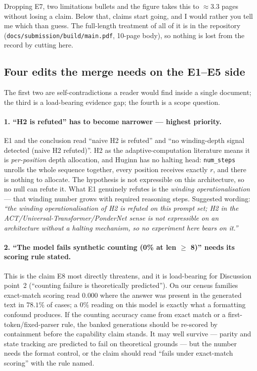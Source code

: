\documentclass[11pt,a4paper]{article}
\begin{document}
\noindent Dropping E7, two limitations bullets and the figure takes this to $\approx 3.3$ pages
without losing a claim. Below that, claims start going, and I would rather you tell me which than
guess. The full-length treatment of all of it is in the repository
(\texttt{docs/submission/build/main.pdf}, 10-page body), so nothing is lost from the record by
cutting here.

\subsection*{Four edits the merge needs on the E1--E5 side}

The first two are self-contradictions a reader would find inside a single document; the third is a
load-bearing evidence gap; the fourth is a scope question.

\paragraph{1. ``H2 is refuted'' has to become narrower --- highest priority.}
E1 and the conclusion read ``naive H2 is refuted'' and ``no winding-depth signal detected (naive H2
refuted)''. H2 as the adaptive-computation literature means it is \emph{per-position} depth
allocation, and Huginn has no halting head: \texttt{num\_steps} unrolls the whole sequence
together, every position receives exactly $r$, and there is nothing to allocate. The hypothesis is
not expressible on this architecture, so no null can refute it. What E1 genuinely refutes is the
\emph{winding operationalisation} --- that winding number grows with required reasoning steps.
Suggested wording: \emph{``the winding operationalisation of H2 is refuted on this prompt set; H2
in the ACT/Universal-Transformer/PonderNet sense is not expressible on an architecture without a
halting mechanism, so no experiment here bears on it.''}

\paragraph{2. ``The model fails synthetic counting (0\% at len $\ge$ 8)'' needs its scoring rule
stated.} This is the claim E8 most directly threatens, and it is load-bearing for Discussion
point~2 (``counting failure is theoretically predicted''). On our census families exact-match
scoring read $0.000$ where the answer was present in the generated text in $78.1\%$ of cases; a
$0\%$ reading on this model is exactly what a formatting confound produces. If the counting
accuracy came from exact match or a first-token/fixed-parser rule, the banked generations should be
re-scored by containment before the capability claim stands. It may well survive --- parity and
state tracking are predicted to fail on theoretical grounds --- but the number needs the format
control, or the claim should read ``fails under exact-match scoring'' with the rule named.
\end{document}
